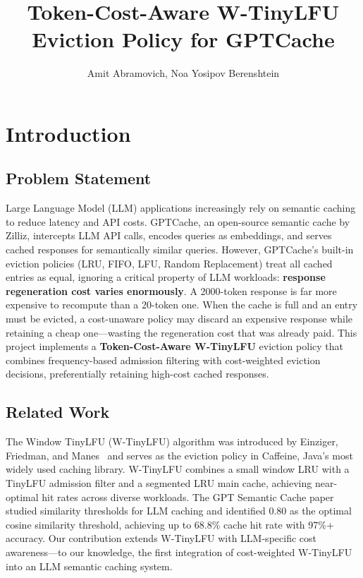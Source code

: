 \documentclass[11pt,a4paper]{article}
\title{\textbf{Token-Cost-Aware W-TinyLFU Eviction Policy for GPTCache}}
\author{Amit Abramovich, Noa Yosipov Berenshtein}
\date{}
\begin{document}
\maketitle

\tableofcontents
\newpage

\section{Introduction}

\subsection{Problem Statement}

Large Language Model (LLM) applications increasingly rely on semantic caching to reduce latency and API costs.
GPTCache, an open-source semantic cache by Zilliz, intercepts LLM API calls, encodes queries as embeddings, and serves cached responses for semantically similar queries.
However, GPTCache's built-in eviction policies (LRU, FIFO, LFU, Random Replacement) treat all cached entries as equal, ignoring a critical property of LLM workloads: \textbf{response regeneration cost varies enormously}.
A 2000-token response is far more expensive to recompute than a 20-token one.
When the cache is full and an entry must be evicted, a cost-unaware policy may discard an expensive response while retaining a cheap one---wasting the regeneration cost that was already paid.
This project implements a \textbf{Token-Cost-Aware W-TinyLFU} eviction policy that combines frequency-based admission filtering with cost-weighted eviction decisions, preferentially retaining high-cost cached responses.

\subsection{Related Work}

The Window TinyLFU (W-TinyLFU) algorithm was introduced by Einziger, Friedman, and Manes~\cite{tinylfu} and serves as the eviction policy in Caffeine, Java's most widely used caching library.
W-TinyLFU combines a small window LRU with a TinyLFU admission filter and a segmented LRU main cache, achieving near-optimal hit rates across diverse workloads.
The GPT Semantic Cache paper~\cite{gptsemcache} studied similarity thresholds for LLM caching and identified 0.80 as the optimal cosine similarity threshold, achieving up to 68.8\% cache hit rate with 97\%+ accuracy.
Our contribution extends W-TinyLFU with LLM-specific cost awareness---to our knowledge, the first integration of cost-weighted W-TinyLFU into an LLM semantic caching system.
\end{document}

